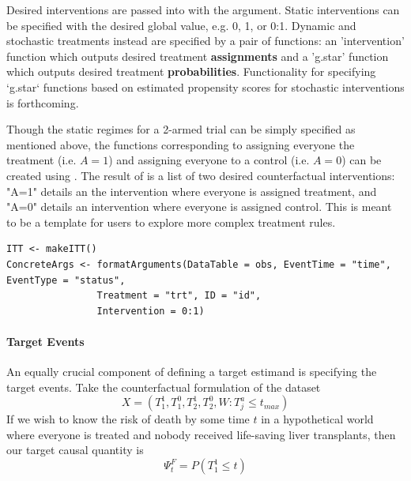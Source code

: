 \documentclass{report}
\newcommand{\1}{\ensuremath{\mathbf{1}}}
\renewcommand{\L}{\ensuremath{W}}
\begin{document}
Desired interventions are passed into  with the  argument. Static interventions can be specified with the desired global value, e.g. 0, 1, or 0:1. Dynamic and stochastic treatments instead are specified by a pair of functions: an 'intervention' function which outputs desired treatment \textbf{\textbf{assignments}} and a 'g.star' function which outputs desired treatment \textbf{\textbf{probabilities}}. Functionality for specifying `g.star` functions based on estimated propensity scores for stochastic interventions is forthcoming.

Though the static regimes for a 2-armed trial can be simply specified as mentioned above, the functions corresponding to assigning everyone the treatment (i.e. \(A = 1\)) and assigning everyone to a control (i.e. \(A = 0\)) can be created using . The result of  is a list of two desired counterfactual interventions: "A=1" details an the intervention where everyone is assigned treatment, and "A=0" details an intervention where everyone is assigned control. This is meant to be a template for users to explore more complex treatment rules.

\begin{lstlisting}
ITT <- makeITT()
ConcreteArgs <- formatArguments(DataTable = obs, EventTime = "time", EventType = "status", 
				Treatment = "trt", ID = "id", 
				Intervention = 0:1)
\end{lstlisting}

\paragraph{Target Events}
\label{TargetEvent}
An equally crucial component of defining a target estimand is specifying the target events. Take the counterfactual formulation of the  dataset
\[ X = (T^1_1, T^0_1, T^1_2, T^0_2, \L : T^a_j \leq t_{max}) \]
If we wish to know the risk of death by some time \(t\) in a hypothetical world where everyone is treated and nobody received life-saving liver transplants, then our target causal quantity is
\begin{equation*}
 \Psi^F_t = P(T^1_1 \leq t) \label{survcausalestimand2}
\end{equation*}
\end{document}
